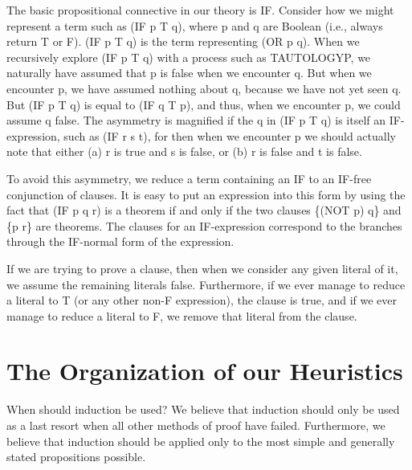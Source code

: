 \documentclass[11pt]{book}
\newcommand{\pubdefaulttextsize}{\large}
\begin{document}
The basic propositional connective in our theory is IF.  
Consider how we might represent a term such as (IF p T q),
where  p and q are Boolean (i.e., always
return T or F).
(IF p T q) is
the term representing (OR p q).  When we recursively explore (IF p T q)
with a process such as  TAUTOLOGYP, we naturally have assumed
that p is false when we encounter q.  But when we encounter p, we have assumed
nothing about q, because we have not yet seen q.  But (IF p T q)
is equal to (IF q T p), and thus, when we encounter p, we could assume
q false.  The asymmetry is magnified if the q in (IF p T q) is itself
an IF-expression, such as (IF r s t), for then when we encounter p we
should actually note that  either  (a) r is true and s is false, or
(b) r is false and t is false.

To avoid this asymmetry, we  reduce
a term containing an IF to an IF-free conjunction of clauses.
It is easy to put an expression into this form by using
the fact that (IF p q r) is a theorem if and only if the two
clauses \{(NOT p) q\} and \{p r\} are theorems.
The clauses for an IF-expression
correspond to the branches through the IF-normal form of the expression.

If we are trying to prove a clause, then when we consider any
given literal of it, we assume the remaining literals false.
Furthermore, if we ever manage to reduce a literal to T (or any other non-F
expression), the clause is true, and if we ever manage to reduce a literal
to F, we remove that literal from the clause.
\section{The Organization of our Heuristics}
\pubdefaulttextsize
When should induction be used?  We believe that induction should
only be used as a last resort when all other methods of
proof have failed.  Furthermore, we believe that
induction should be applied  only to the most simple
and generally stated propositions possible.
\end{document}
